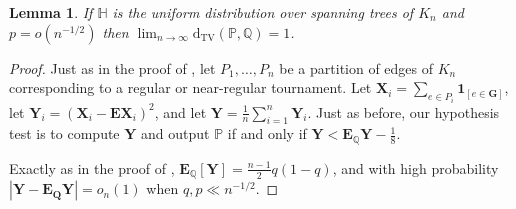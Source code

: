 \documentclass[11pt]{article}
\newcommand{\e}{{\mathbf E}}
\newcommand{\Ind}[1]{{\mathbf 1}_{[#1]}}
\newcommand{\dtv}{\mathrm{d}_{\mathrm{TV}}}
\newcommand{\bG}{\mathbf{G}}
\newcommand{\bQ}{\mathbf{Q}}
\newcommand{\bX}{\mathbf{X}}
\newcommand{\bY}{\mathbf{Y}}
\newcommand{\bbH}{\mathbb{H}}
\newcommand{\bbP}{\mathbb{P}}
\newcommand{\bbQ}{\mathbb{Q}}
\newtheorem{lem}[thm]{Lemma}
\numberwithin{equation}{section}
\numberwithin{thm}{section}
\begin{document}
\begin{lem}
If $\bbH$ is the uniform distribution over spanning trees of $K_n$ and $p = o(n^{-1/2})$ then $\lim_{n \to \infty} \dtv(\bbP,\bbQ) = 1$.
\end{lem}
\begin{proof}
Just as in the proof of , let $P_1,\ldots,P_n$ be a partition of edges of $K_n$ corresponding to a regular or near-regular tournament.
Let $\bX_i = \sum_{e \in P_i} \Ind{e \in \bG}$, let $\bY_i = (\bX_i - \e\bX_i)^2$, and let $\bY = \frac{1}{n}\sum_{i=1}^n \bY_i$.
Just as before, our hypothesis test is to compute $\bY$ and output $\bbP$ if and only if $\bY < \e_{\bbQ}\bY - \frac{1}{8}$.

Exactly as in the proof of , $\e_\bbQ[\bY] = \frac{n-1}{2}q(1-q)$, and with high probability $|\bY - \e_{\bQ}\bY| = o_n(1)$ when $q,p\ll n^{-1/2}$.


\end{proof}
\end{document}
